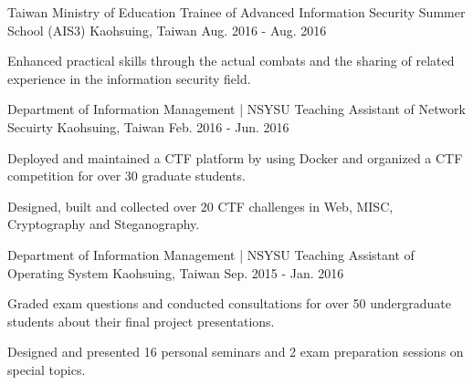 \begin{cventries}

\cventry
{Taiwan Ministry of Education} %
{Trainee of Advanced Information Security Summer School (AIS3)} %
{Kaohsuing, Taiwan} %
{Aug. 2016 - Aug. 2016} %
{ %
\begin{cvitems}
\item {Enhanced practical skills through the actual combats and the sharing of related experience in the information security field.}
\end{cvitems}
}


\cventry
{Department of Information Management | NSYSU} %
{Teaching Assistant of Network Secuirty} %
{Kaohsuing, Taiwan} %
{Feb. 2016 - Jun. 2016} %
{ %
\begin{cvitems}
\item {Deployed and maintained a CTF platform by using Docker and organized a CTF competition for over 30 graduate students.}
\item {Designed, built and collected over 20 CTF challenges in Web, MISC, Cryptography and Steganography.}
\end{cvitems}
}


\cventry
{Department of Information Management | NSYSU} %
{Teaching Assistant of Operating System} %
{Kaohsuing, Taiwan} %
{Sep. 2015 - Jan. 2016} %
{ %
\begin{cvitems}
\item {Graded exam questions and conducted consultations for over 50 undergraduate students about their final project presentations.}
\item {Designed and presented 16 personal seminars and 2 exam preparation sessions on special topics.}
\end{cvitems}
}

\end{cventries}
